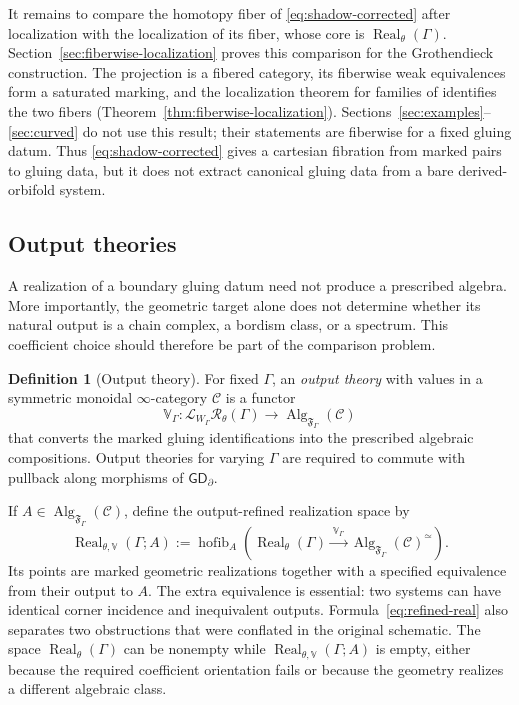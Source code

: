 \documentclass[11pt,letterpaper,twoside]{article}
\theoremstyle{plain}
\theoremstyle{definition}
\newtheorem{definition}[theorem]{Definition}
\theoremstyle{remark}
\newcommand{\namecite}[2]{\citet{#2}}
\newcommand{\BGrm}{\mathsf{GD}_{\partial}}
\newcommand{\Real}{\operatorname{Real}}
\DeclareMathOperator{\hofib}{hofib}
\begin{document}
It remains to compare the homotopy fiber of \eqref{eq:shadow-corrected} after localization with the localization of its fiber, whose core is \(\Real_\theta(\Gamma)\).  Section~\ref{sec:fiberwise-localization} proves this comparison for the Grothendieck construction.  The projection is a fibered category, its fiberwise weak equivalences form a saturated marking, and the localization theorem for families of \namecite{Hinich}{hinich2016} identifies the two fibers (Theorem~\ref{thm:fiberwise-localization}).  Sections~\ref{sec:examples}--\ref{sec:curved} do not use this result; their statements are fiberwise for a fixed gluing datum.  Thus \eqref{eq:shadow-corrected} gives a cartesian fibration from marked pairs to gluing data, but it does not extract canonical gluing data from a bare derived-orbifold system.

\subsection{Output theories}

A realization of a boundary gluing datum need not produce a prescribed algebra.  More importantly, the geometric target alone does not determine whether its natural output is a chain complex, a bordism class, or a spectrum.  This coefficient choice should therefore be part of the comparison problem.

\begin{definition}[Output theory]\label{def:output-theory}
For fixed \(\Gamma\), an \emph{output theory} with values in a symmetric monoidal \(\infty\)-category \(\mathcal C\) is a functor
\begin{equation}\label{eq:output-theory}
 \mathbb V_\Gamma:
 \mathcal L_{W_\Gamma}\mathcal R_\theta(\Gamma)
 \longrightarrow
 \operatorname{Alg}_{\mathfrak F_\Gamma}(\mathcal C)
\end{equation}
that converts the marked gluing identifications into the prescribed algebraic compositions.  Output theories for varying \(\Gamma\) are required to commute with pullback along morphisms of \(\BGrm\).
\end{definition}

If \(A\in\operatorname{Alg}_{\mathfrak F_\Gamma}(\mathcal C)\), define the output-refined realization space by
\begin{equation}\label{eq:refined-real}
 \Real_{\theta,\mathbb V}(\Gamma;A)
 :=\hofib_A\left(
 \Real_\theta(\Gamma)
 \xrightarrow{\ \mathbb V_\Gamma\ }
 \operatorname{Alg}_{\mathfrak F_\Gamma}(\mathcal C)^{\simeq}
 \right).
\end{equation}
Its points are marked geometric realizations together with a specified equivalence from their output to \(A\).  The extra equivalence is essential: two systems can have identical corner incidence and inequivalent outputs.  Formula~\eqref{eq:refined-real} also separates two obstructions that were conflated in the original schematic.  The space \(\Real_\theta(\Gamma)\) can be nonempty while \(\Real_{\theta,\mathbb V}(\Gamma;A)\) is empty, either because the required coefficient orientation fails or because the geometry realizes a different algebraic class.
\end{document}
